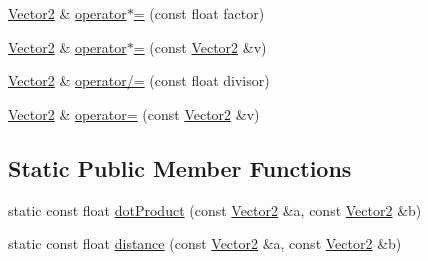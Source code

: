\begin{DoxyCompactItemize}
\item 
\hyperlink{classprism_1_1geometry_1_1_vector2}{Vector2} \& \hyperlink{classprism_1_1geometry_1_1_vector2_a2e13a4f0af3ec0ede4aaa7ae113d30dd}{operator$\ast$=} (const float factor)
\item 
\hyperlink{classprism_1_1geometry_1_1_vector2}{Vector2} \& \hyperlink{classprism_1_1geometry_1_1_vector2_aca53532527a3e864041f70a303dcce8d}{operator$\ast$=} (const \hyperlink{classprism_1_1geometry_1_1_vector2}{Vector2} \&v)
\item 
\hyperlink{classprism_1_1geometry_1_1_vector2}{Vector2} \& \hyperlink{classprism_1_1geometry_1_1_vector2_ad0cbd6b3d936f20fa7915a8a3e3acafb}{operator/=} (const float divisor)
\item 
\hyperlink{classprism_1_1geometry_1_1_vector2}{Vector2} \& \hyperlink{classprism_1_1geometry_1_1_vector2_a2c67a5c7d9f01609477f33de9dad039f}{operator=} (const \hyperlink{classprism_1_1geometry_1_1_vector2}{Vector2} \&v)
\end{DoxyCompactItemize}
\subsection*{Static Public Member Functions}
\begin{DoxyCompactItemize}
\item 
static const float \hyperlink{classprism_1_1geometry_1_1_vector2_a9938aca4d3f344149c7c83c21e18e0a8}{dot\+Product} (const \hyperlink{classprism_1_1geometry_1_1_vector2}{Vector2} \&a, const \hyperlink{classprism_1_1geometry_1_1_vector2}{Vector2} \&b)
\item 
static const float \hyperlink{classprism_1_1geometry_1_1_vector2_a1f5f94de630102484188a59c17ffceb8}{distance} (const \hyperlink{classprism_1_1geometry_1_1_vector2}{Vector2} \&a, const \hyperlink{classprism_1_1geometry_1_1_vector2}{Vector2} \&b)
\end{DoxyCompactItemize}
